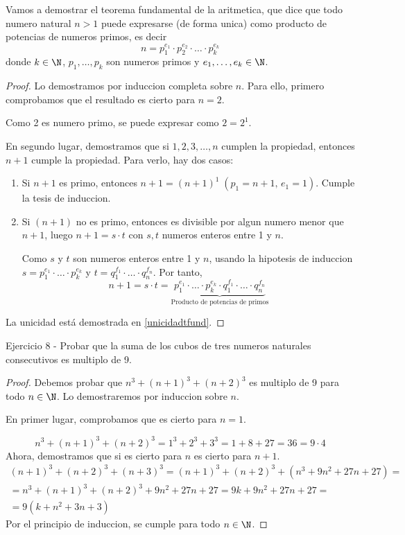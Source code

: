 \begin{example}
	\label{tfundaritmetica}
	Vamos a demostrar el teorema fundamental de la aritmetica, que dice que todo numero natural \(n > 1 \) puede expresarse (de forma unica) como producto de potencias de numeros primos, es decir
	\[
		n = p^{e_1}_1 \cdot p^{e_2}_2 \cdot \ldots \cdot p^{e_k}_k
	\]
	donde \(k \in \N \), \(p_1, \ldots, p_k \) son numeros primos y \(e_1, \ldots, e_k \in \N \).
\end{example}
\begin{proof}
	Lo demostramos por induccion completa sobre \(n \). Para ello, primero comprobamos que el resultado es cierto para \(n = 2\).

	Como 2 es numero primo, se puede expresar como \(2 = 2^{1}\).

	En segundo lugar, demostramos que si \(1,2,3,\ldots,n \) cumplen la propiedad, entonces \(n + 1 \) cumple la propiedad. Para verlo, hay dos casos:
	\begin{enumerate}
		\item Si \(n + 1\) es primo, entonces \(n + 1 = (n+1)^{1} \; (p_1 = n + 1, \, e_1 = 1 ) \). Cumple la tesis de induccion.
		\item Si \((n+1 )\) no es primo, entonces  es divisible por algun numero menor que \(n + 1 \), luego \(n + 1 = s \cdot t \) con \(s,t \) numeros enteros entre 1 y \(n\).

		      Como \(s\) y \(t \) son numeros enteros entre 1 y \(n \), usando la hipotesis de induccion \(s = p^{e_1}_1 \cdot \ldots \cdot p^{e_k}_k\) y \(t = q^{f_1}_1 \cdot \ldots \cdot q^{f_n}_n  \). Por tanto,
		      \[
			      n + 1 = s \cdot t = \underbrace{p^{e_1}_1 \cdot \ldots \cdot p^{e_k}_k \cdot q^{f_1}_1 \cdot \ldots \cdot q^{f_n}_n}_{\text{Producto de potencias de primos}}
		      \]
	\end{enumerate}
	La unicidad está demostrada en \ref{unicidadtfund}.
\end{proof}

\begin{example}
	Ejercicio 8 - Probar que la suma de los cubos de tres numeros naturales consecutivos es multiplo de 9.
\end{example}
\begin{proof}
	Debemos probar que \(n^{3} + (n+1)^{3} + (n+2)^{3}\) es multiplo de 9 para todo \(n \in \N \). Lo demostraremos por induccion sobre \(n \).

	En primer lugar, comprobamos que es cierto para \(n = 1\).

	\[
		n^{3} + (n+1 )^{3} + (n+2)^{3} = 1^{3} + 2^{3} + 3^{3} = 1 + 8 + 27 = 36 = 9 \cdot 4
	\]
	Ahora, demostramos que si es cierto para \(n \) es cierto para \(n + 1 \).
	\begin{multline*}
		(n+1)^{3} + (n+2)^{3} + (n+3)^{3} = (n+1)^{3} + (n+2)^{3} + (n^{3} + 9n^{2} + 27n + 27) = \\  = n^{3} + (n+1)^{3} + (n+2)^{3} + 9n^{2} + 27n + 27 = 9k + 9n^{2} + 27n + 27 = \\ = \boxed{9(k + n^{2} + 3n + 3)}
	\end{multline*}
	Por el principio de induccion, se cumple para todo \(n \in \N \).
\end{proof}

